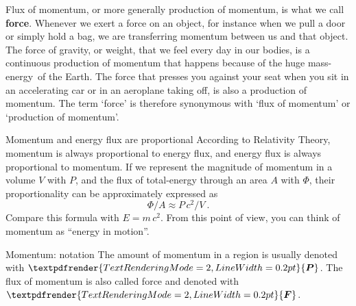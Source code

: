 \documentclass[a4paper,12pt,%
onecolumn,oneside,%
british%
]{memoir}
\renewcommand*{\bm}[1]{\textpdfrender{TextRenderingMode=2,LineWidth=0.2pt}{\boldsymbol{#1}}}
\renewcommand*{\|}[1][]{\nonscript\:#1\vert\nonscript\:\mathopen{}}
\newcommand*{\chap}{Chapter}%
\newcommand*{\masse}{mass-energy}
\newcommand*{\yc}{c} %
\newcommand*{\yM}{m}%
\newcommand*{\yE}{E}
\newcommand*{\yH}{\varPhi}%
\newcommand*{\yP}{\bm{P}}
\newcommand*{\yF}{\bm{F}}
\begin{document}
\medskip

Flux of momentum, or more generally production of momentum, is what we call \textbf{force}. Whenever we exert a force on an object, for instance when we pull a door or simply hold a bag, we are transferring momentum between us and that object. The force of gravity, or weight, that we feel every day in our bodies, is a continuous production of momentum that happens because of the huge \masse\ of the Earth. The force that presses you against your seat when you sit in an accelerating car or in an aeroplane taking off, is also a production of momentum. The term \enquote*{force} is therefore synonymous with \enquote*{flux of momentum} or \enquote*{production of momentum}.


\begin{extra}{Momentum and energy flux are proportional}
  According to Relativity Theory, momentum is always proportional to energy flux, and energy flux is always proportional to momentum. If we represent the magnitude of momentum in a volume $V$ with $P$, and the flux of total-energy through an area $A$ with  $\yH$, their proportionality can be approximately expressed as
  \begin{equation}
    \label{eq:momentum_heat}
    \yH/A \approx P\,\yc^{2}/V \ .
  \end{equation}
  Compare this formula with $\yE=\yM\,\yc^{2}$. From this point of view, you can think of momentum as \enquote{energy in motion}. %
\end{extra}

\begin{definition}{Momentum: notation}
  The amount of momentum in a region is usually denoted with $\yP$. The flux of momentum is also called force and denoted with $\yF$.
\end{definition}
\end{document}
